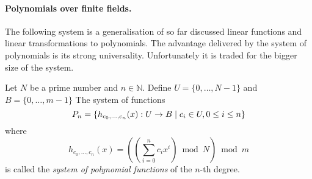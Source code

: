 \paragraph{Polynomials over finite fields.}
The following system is a generalisation of so far discussed linear functions and linear transformations to polynomials. The advantage delivered by the system of polynomials is its strong universality. Unfortunately it is traded for the bigger size of the system.

\begin{definition}
Let $N$ be a prime number and $n \in \mathbb{N}$. Define $U = \{0, \dots, N - 1 \}$ and $B = \{0, \dots, m - 1\}$ The system of functions \[ P_n = \left\lbrace h_{c_0, \dots, c_n}(x): U \rightarrow B \mid c_i \in U, 0 \leq i \leq n \right\rbrace \] where \[ h_{c_0, \dots, c_n}(x) = \left( \left(\displaystyle \sum_{i=0}^{n} c_i x^i \right) \bmod N \right) \bmod m \] is called the \emph{system of polynomial functions} of the $n$-th degree.
\end{definition}

